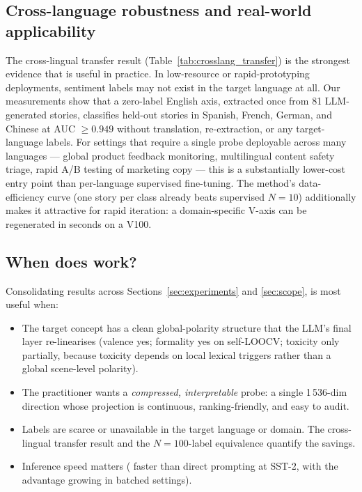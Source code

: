 \subsection{Cross-language robustness and real-world applicability}

The cross-lingual transfer result (Table~\ref{tab:crosslang_transfer}) is
the strongest evidence that \ours{} is useful in practice. In low-resource
or rapid-prototyping deployments, sentiment labels may not exist in the
target language at all. Our measurements show that a zero-label English
axis, extracted once from 81 LLM-generated stories, classifies held-out
stories in Spanish, French, German, and Chinese at AUC $\geq 0.949$ without
translation, re-extraction, or any target-language labels. For settings
that require a single probe deployable across many languages --- global
product feedback monitoring, multilingual content safety triage, rapid
A/B testing of marketing copy --- this is a substantially lower-cost entry
point than per-language supervised fine-tuning. The method's
data-efficiency curve (one story per class already beats supervised
$N=10$) additionally makes it attractive for rapid iteration: a
domain-specific V-axis can be regenerated in seconds on a V100.

\subsection{When does \ours{} work?}

Consolidating results across Sections~\ref{sec:experiments} and
\ref{sec:scope}, \ours{} is most useful when:

\begin{itemize}[leftmargin=*]
\item The target concept has a clean global-polarity structure that the
LLM's final layer re-linearises (valence yes; formality yes on
self-LOOCV; toxicity only partially, because toxicity depends on local
lexical triggers rather than a global scene-level polarity).
\item The practitioner wants a \emph{compressed, interpretable} probe:
a single 1\,536-dim direction whose projection is continuous, ranking-friendly,
and easy to audit.
\item Labels are scarce or unavailable in the target language or domain.
The cross-lingual transfer result and the $N\!=\!100$-label equivalence
quantify the savings.
\item Inference speed matters (\speedup{} faster than direct prompting at
SST-2, with the advantage growing in batched settings).
\end{itemize}

